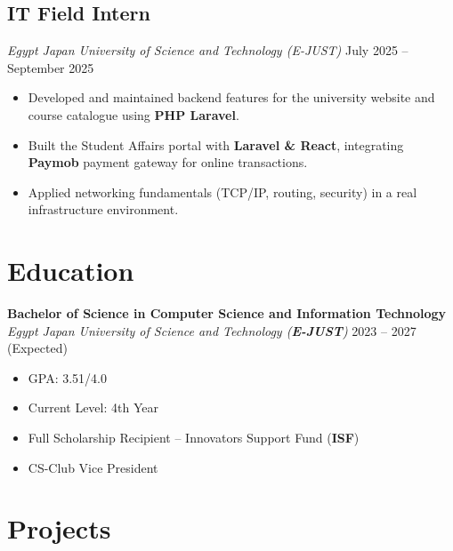 \documentclass[11pt,a4paper]{article}
\begin{document}
\subsection{IT Field Intern}
\textit{Egypt Japan University of Science and Technology (E-JUST)} \hfill July 2025 -- September 2025
\begin{itemize}
    \item Developed and maintained backend features for the university website and course catalogue using \textbf{PHP Laravel}.
    \item Built the Student Affairs portal with \textbf{Laravel \& React}, integrating \textbf{Paymob} payment gateway for online transactions.
    \item Applied networking fundamentals (TCP/IP, routing, security) in a real infrastructure environment.
\end{itemize}


\section{Education}
\textbf{Bachelor of Science in Computer Science and Information Technology} \\
\textit{Egypt Japan University of Science and Technology (\textbf{E-JUST})} \hfill 2023 -- 2027 (Expected)
\begin{minipage}[t]{0.48\textwidth}
\begin{itemize}[noitemsep]
    \item GPA: 3.51/4.0
    \item Current Level: 4th Year
\end{itemize}
\end{minipage}%
\hfill
\begin{minipage}[t]{0.48\textwidth}
\begin{itemize}[noitemsep]
    \item Full Scholarship Recipient -- Innovators Support Fund (\textbf{ISF})
    \item CS-Club Vice President
\end{itemize}
\end{minipage}

\section{Projects}
\end{document}
